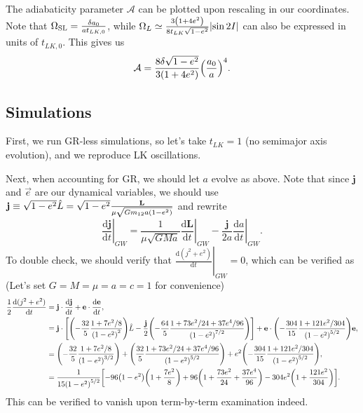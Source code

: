 \documentclass[11pt,
        usenames, %
        dvipsnames %
    ]{article}
\newcommand*{\rd}[2]{\frac{\mathrm{d}#1}{\mathrm{d}#2}}
\newcommand*{\bm}[1]{\boldsymbol{\mathbf{#1}}}
\newcommand*{\at}[1]{\left.#1\right|}
\DeclarePairedDelimiter\abs{\lvert}{\rvert}
\DeclarePairedDelimiter\p{\lparen}{\rparen}
\DeclarePairedDelimiter\s{\lbrack}{\rbrack}
\begin{document}
The adiabaticity parameter $\mathcal{A}$ can be plotted upon rescaling in our
coordinates. Note that $\Omega_{\rm SL} = \frac{\delta a_0}{at_{LK, 0}}$, while
$\Omega_L \simeq \frac{3\p*{1 + 4e^2}}{8t_{LK}\sqrt{1 - e^2}}\abs*{\sin 2I}$ can
also be expressed in units of $t_{LK, 0}$. This gives us
\begin{equation}
    \mathcal{A} = \frac{8\delta \sqrt{1 - e^2}}{3\p*{1 +
        4e^2}}\p*{\frac{a_0}{a}}^4.
\end{equation}

\subsection{Simulations}

First, we run GR-less simulations, so let's take $t_{LK} = 1$ (no semimajor axis
evolution), and we reproduce LK oscillations.

Next, when accounting for GR, we should let $a$ evolve as above. Note that since
$\bm{j}$ and $\vec{e}$ are our dynamical variables, we should use $\bm{j} \equiv
\sqrt{1 - e^2} \hat{L} = \sqrt{1 - e^2}\frac{\bm{L}}{\mu \sqrt{Gm_{12}a\p*{1 -
e^2}}}$ and rewrite
\begin{equation}
    \at{\rd{\bm{j}}{t}}_{GW} = \frac{1}{\mu\sqrt{GMa}}\at{\rd{\bm{L}}{t}}_{GW}
        - \frac{\bm{j}}{2a}\at{\rd{a}{t}}_{GW}.
\end{equation}
To double check, we should verify that $\at{\rd{(j^2 + e^2)}{t}}_{GW} = 0$,
which can be verified as (Let's set $G = M = \mu = a = c = 1$ for convenience)
\begin{align}
    \frac{1}{2}\rd{(j^2 + e^2)}{t}
        &= \bm{j} \cdot \rd{\bm{j}}{t} + \bm{e} \cdot \rd{\bm{e}}{t},\\
        &= \bm{j} \cdot \s*{
            \p*{-\frac{32}{5}\frac{1 + 7e^2/8}{\p*{1 - e^2}^2}}\hat{L}
                - \frac{\bm{j}}{2}\p*{-\frac{64}{5}
                    \frac{1 + 73e^2/24 + 37e^4/96}{\p*{1 - e^2}^{7/2}}}}
            + \bm{e} \cdot
                \p*{-\frac{304}{15}\frac{1 + 121e^2/304}{\p*{1 - e^2}^{5/2}}}
                \bm{e},\\
        &= \p*{-\frac{32}{5}\frac{1 + 7e^2/8}{\p*{1 - e^2}^{3/2}}}
                + \p*{\frac{32}{5}
                    \frac{1 + 73e^2/24 + 37e^4/96}{\p*{1 - e^2}^{5/2}}}
            + e^2 \p*{-\frac{304}{15}\frac{1 + 121e^2/304}{\p*{1 - e^2}^{5/2}}}
                ,\\
        &= \frac{1}{15\p*{1 - e^2}^{5/2}}\s*{
            -96\p*{1 - e^2}\p*{1 + \frac{7e^2}{8}}
                + 96\p*{1 + \frac{73e^2}{24} + \frac{37e^4}{96}}
                - 304e^2\p*{1 + \frac{121e^2}{304}}}.
\end{align}
This can be verified to vanish upon term-by-term examination indeed.
\end{document}
